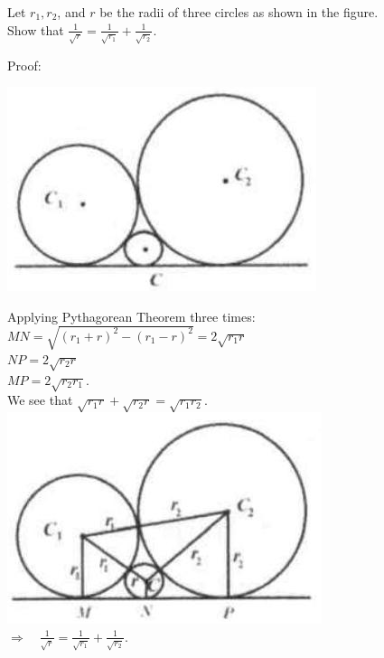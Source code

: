 \documentclass{article}
\begin{document}
Let \(r_{1}, r_{2}\), and \(r\) be the radii of three circles as shown in the figure.\\
Show that \(\frac{1}{\sqrt{r}}=\frac{1}{\sqrt{r_{1}}}+\frac{1}{\sqrt{r_{2}}}\).

Proof:
\begin{center}
\includegraphics[width=\textwidth]{images/179(2).jpg}
\end{center}

Applying Pythagorean Theorem three times:\\
\(M N=\sqrt{\left(r_{1}+r\right)^{2}-\left(r_{1}-r\right)^{2}}=2 \sqrt{r_{1} r}\)\\
\(N P=2 \sqrt{r_{2} r}\)\\
\(M P=2 \sqrt{r_{2} r_{1}}\).\\
We see that \(\sqrt{r_{1} r}+\sqrt{r_{2} r}=\sqrt{r_{1} r_{2}}\).\\
\centering
\includegraphics[width=\textwidth]{images/179(1).jpg}\\
\(\Rightarrow \quad \frac{1}{\sqrt{r}}=\frac{1}{\sqrt{r_{1}}}+\frac{1}{\sqrt{r_{2}}}\).
\end{document}
